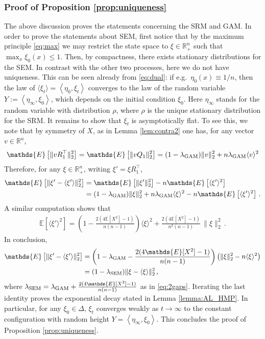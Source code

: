 \documentclass[11pt,reqno]{amsart}
\theoremstyle{remark}
\theoremstyle{definition}
\numberwithin{equation}{section}
\numberwithin{figure}{section}
\newcommand{\E}{\mathds{E}}
\newcommand{\R}{\mathbb{R}}
\newcommand{\quadre}[1]{\left[#1\right]}
\newcommand{\scalar}[2]{\left\langle #1, #2 \right\rangle}
\let\r=\rho  \let\s=\sigma \let\t=\tau   \let\th=\vartheta
\let\D=\Delta \let\F=\Phi  \let\G=\Gamma  \let\L=\Lambda \let\The=\Theta
\begin{document}
\subsubsection{Proof of Proposition \ref{prop:uniqueness}}
The above discussion proves the statements concerning the SRM and GAM. In order to prove the statements about SEM, first notice that
by the maximum principle \eqref{eq:max} we may restrict the state space to $\xi\in\R_+^n$ such that $\max_{x}\xi_{0}(x)\le 1$. 
Then, by compactness, there exists stationary distributions for the SEM. In contrast with the other two processes, here we do not have uniqueness. This can be seen already from \eqref{eq:dual}: if e.g.\ $\eta_0(x)\equiv 1/n$, then the law of $ \langle \xi_t\rangle = \scalar{\eta_0}{\xi_t}$
converges to the law of the random variable $Y:=\scalar{\eta_\infty}{\xi_0}$, which depends on the initial condition $\xi_0$.  Here $\eta_\infty$ stands for the random variable with distribution $\r$, where $\r$ is the unique stationary distribution for the SRM. It remains to show that $\xi_t$ is asymptotically flat. 
To see this,  we note that by symmetry  of $X$, as in Lemma \ref{lem:contra2} 
one has, for any vector $v \in\R^n$,
\begin{align*}
\E\quadre{\|vR_1^\top\|_2^2}=\E\quadre{\|vQ_1\|_2^2}=
(1-\lambda_{\rm GAM})\|v\|_2^2+n\lambda_{\rm GAM}  \langle v\rangle^2
\end{align*}
Therefore, for any $\xi\in\R_+^n$, writing $\xi'=\xi R_1^\top$,
\begin{align*}
\E\quadre{\|\xi' - \langle \xi' \rangle \|_2^2}&=\E\quadre{\|\xi'\|_2^2 }- n\E\quadre{\langle \xi'\rangle^2}\\
 &  = 
(1-\lambda_{\rm GAM})\|\xi\|_2^2+n\lambda_{\rm GAM}  \langle \xi\rangle^2- n\E\quadre{\langle \xi'\rangle^2}
\,.
\end{align*}
A similar computation  shows that 
\begin{align}\label{eq:sipo}
\E\quadre{\langle \xi'\rangle^2}
= \left(1-\frac{2(4\E[X^2]-1)}{n(n-1)}\right)\langle \xi\rangle^2 +\frac{2(4\E[X^2]-1)}{n^2(n-1)}\,\|\xi\|_2^2\,.
\end{align}
In conclusion,
\begin{align}\label{eq:SEMt}
\E\quadre{\|\xi' - \langle \xi' \rangle \|_2^2}&=\left(1-\lambda_{\rm GAM}-\frac{2(4\E[X^2]-1)}{n(n-1)}\right)
\left(\|\xi\|_2^2 - n\langle \xi\rangle^2\right)\nonumber\\
&=(1-\lambda_{\rm SEM})\|\xi - \langle \xi \rangle \|_2^2\,,
\end{align}
where $\lambda_{\rm SEM} = \lambda_{\rm GAM}+\frac{2(4\E[X^2]-1)}{n(n-1)}$ as in \eqref{eq:2gaps}.
Iterating the last identity proves the exponential decay stated in Lemma \ref{lemma:AL_HMP}. In particular, for any $\xi_0\in\D$, $\xi_t$ converges weakly as $t\to\infty$ to the constant configuration with random height $Y=\scalar{\eta_\infty}{\xi_0}$. This concludes the proof of Proposition \ref{prop:uniqueness}.
\end{document}
